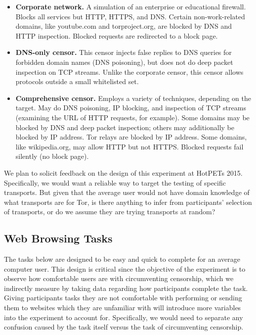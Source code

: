 \documentclass[letterpaper,twocolumn,11pt]{article}
\begin{document}
\begin{itemize} \itemsep1pt \parskip0pt 
\item{\bfseries Corporate network.}
A simulation of an enterprise or educational firewall.
Blocks all services but HTTP, HTTPS, and DNS.
Certain non-work-related domains, like youtube.com and torproject.org,
are blocked by DNS and HTTP inspection.
Blocked requests are redirected to a block page.
\item{\bfseries DNS-only censor.}
This censor injects false replies to DNS queries
for forbidden domain names (DNS poisoning),
but does not do deep packet inspection on TCP streams.
Unlike the corporate censor, this censor allows protocols
outside a small whitelisted set.
\item{\bfseries Comprehensive censor.}
Employs a variety of techniques, depending on the target.
May do DNS poisoning, IP blocking, and inspection of TCP streams
(examining the URL of HTTP requests, for example).
Some domains may be blocked by DNS and deep packet inspection;
others may additionally be blocked by IP address.
Tor relays are blocked by IP address.
Some domains, like wikipedia.org, may allow HTTP but not HTTPS.
Blocked requests fail silently (no block page).
\end{itemize}

We plan to solicit feedback on the design of this experiment at HotPETs 2015.
Specifically, we would want a reliable way to target the testing of 
specific transports. But given that the average user would not have domain knowledge of 
what transports are for Tor, is there anything to infer from participants' selection of transports, 
or do we assume they are trying transports at random?

\subsection{Web Browsing Tasks}
\indent \indent The tasks below are designed to be easy and quick to complete for an average
computer user. This design is critical since the objective of the experiment is to observe
how comfortable users are with circumventing censorship, which we indirectly measure
by taking data regarding how participants complete the task. Giving participants tasks 
they are not comfortable with performing or sending them to websites which they are 
unfamiliar with will introduce more variables into the experiment to account for. 
Specifically, we would need to separate any confusion caused by the task itself versus
the task of circumventing censorship. 
\end{document}

